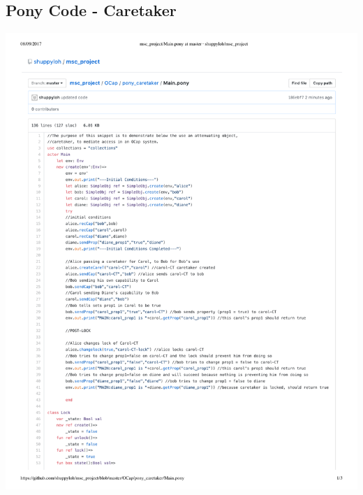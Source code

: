 \documentclass[a4paper,11pt,twoside]{article}
\begin{document}
{\subsection{Pony Code - Caretaker}\label{sec:code_Caretaker}
\begin{minipage}{\textwidth}
\includegraphics[width=\textwidth,valign=t,page=1]{figures/code_Caretaker.pdf}
\end{minipage}
\begin{minipage}{\textwidth}

\end{minipage}}
\end{document}
